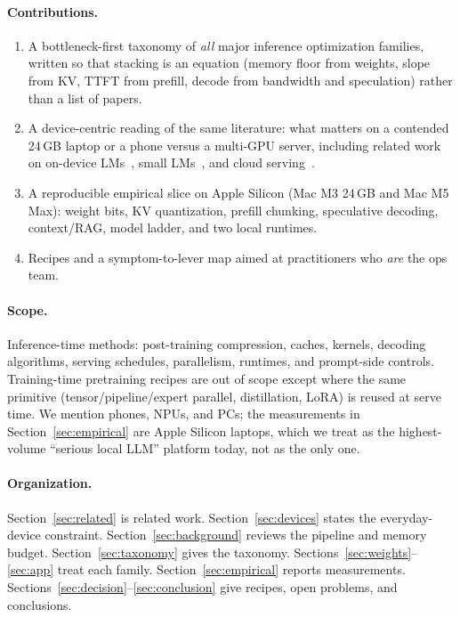 \paragraph{Contributions.}
\begin{enumerate}[leftmargin=*,itemsep=2pt]
  \item A bottleneck-first taxonomy of \emph{all} major inference optimization families, written so that stacking is an equation (memory floor from weights, slope from KV, TTFT from prefill, decode from bandwidth and speculation) rather than a list of papers.
  \item A device-centric reading of the same literature: what matters on a contended 24\,GB laptop or a phone versus a multi-GPU server, including related work on on-device LMs~\citep{xu2024ondevice,qu2025edge}, small LMs~\citep{lu2024slm,van2024surveyslm}, and cloud serving~\citep{miao2023survey,lin2024qwq}.
  \item A reproducible empirical slice on Apple Silicon (Mac M3 24\,GB and Mac M5 Max): weight bits, KV quantization, prefill chunking, speculative decoding, context/RAG, model ladder, and two local runtimes.
  \item Recipes and a symptom-to-lever map aimed at practitioners who \emph{are} the ops team.
\end{enumerate}

\paragraph{Scope.}
Inference-time methods: post-training compression, caches, kernels, decoding algorithms, serving schedules, parallelism, runtimes, and prompt-side controls. Training-time pretraining recipes are out of scope except where the same primitive (tensor/pipeline/expert parallel, distillation, LoRA) is reused at serve time. We mention phones, NPUs, and PCs; the measurements in Section~\ref{sec:empirical} are Apple Silicon laptops, which we treat as the highest-volume ``serious local LLM'' platform today, not as the only one.

\paragraph{Organization.}
Section~\ref{sec:related} is related work. Section~\ref{sec:devices} states the everyday-device constraint. Section~\ref{sec:background} reviews the pipeline and memory budget. Section~\ref{sec:taxonomy} gives the taxonomy. Sections~\ref{sec:weights}--\ref{sec:app} treat each family. Section~\ref{sec:empirical} reports measurements. Sections~\ref{sec:decision}--\ref{sec:conclusion} give recipes, open problems, and conclusions.
